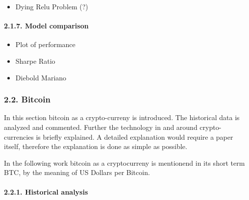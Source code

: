 \documentclass[
]{article}
\providecommand{\tightlist}{%
  \setlength{\itemsep}{0pt}\setlength{\parskip}{0pt}}
\begin{document}
\begin{itemize}
\tightlist
\item
  Dying Relu Problem (?)
\end{itemize}

\hypertarget{model-comparison}{%
\paragraph{2.1.7. Model comparison}\label{model-comparison}}

\begin{itemize}
\tightlist
\item
  Plot of performance
\item
  Sharpe Ratio
\item
  Diebold Mariano
\end{itemize}

\newpage

\hypertarget{bitcoin}{%
\subsubsection{2.2. Bitcoin}\label{bitcoin}}

In this section bitcoin as a crypto-curreny is introduced. The
historical data is analyzed and commented. Further the technology in and
around crypto-currencies is briefly explained. A detailed explanation
would require a paper itself, therefore the explanation is done as
simple as possible.

In the following work bitcoin as a cryptocurreny is mentionend in its
short term BTC, by the meaning of US Dollars per Bitcoin.

\hypertarget{historical-analysis}{%
\paragraph{2.2.1. Historical analysis}\label{historical-analysis}}

~
\end{document}
